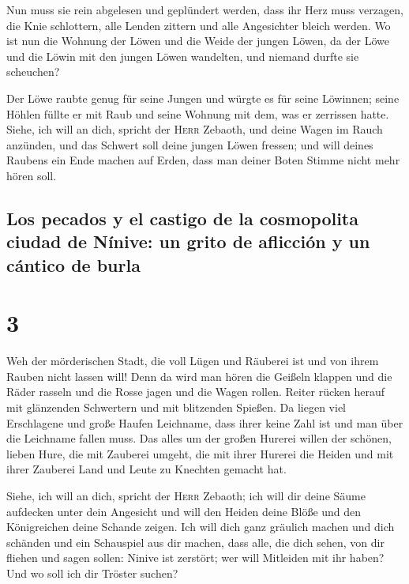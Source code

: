  Nun muss sie rein abgelesen und geplündert werden, dass
ihr Herz muss verzagen, die Knie schlottern, alle Lenden zittern und
alle Angesichter bleich werden.  Wo ist nun die Wohnung
der Löwen und die Weide der jungen Löwen, da der Löwe und die Löwin mit
den jungen Löwen wandelten, und niemand durfte sie scheuchen?

 Der Löwe raubte genug für seine Jungen und würgte es für
seine Löwinnen; seine Höhlen füllte er mit Raub und seine Wohnung mit
dem, was er zerrissen hatte.  Siehe, ich will an dich,
spricht der \textsc{Herr} Zebaoth, und deine Wagen im Rauch anzünden,
und das Schwert soll deine jungen Löwen fressen; und will deines Raubens
ein Ende machen auf Erden, dass man deiner Boten Stimme nicht mehr hören
soll.

\hypertarget{los-pecados-y-el-castigo-de-la-cosmopolita-ciudad-de-nuxednive-un-grito-de-aflicciuxf3n-y-un-cuxe1ntico-de-burla}{%
\subsection{Los pecados y el castigo de la cosmopolita ciudad de Nínive:
un grito de aflicción y un cántico de
burla}\label{los-pecados-y-el-castigo-de-la-cosmopolita-ciudad-de-nuxednive-un-grito-de-aflicciuxf3n-y-un-cuxe1ntico-de-burla}}

\hypertarget{section-2}{%
\section{3}\label{section-2}}

 Weh der mörderischen Stadt, die voll Lügen und Räuberei
ist und von ihrem Rauben nicht lassen will!  Denn da wird
man hören die Geißeln klappen und die Räder rasseln und die Rosse jagen
und die Wagen rollen.  Reiter rücken herauf mit glänzenden
Schwertern und mit blitzenden Spießen. Da liegen viel Erschlagene und
große Haufen Leichname, dass ihrer keine Zahl ist und man über die
Leichname fallen muss.  Das alles um der großen Hurerei
willen der schönen, lieben Hure, die mit Zauberei umgeht, die mit ihrer
Hurerei die Heiden und mit ihrer Zauberei Land und Leute zu Knechten
gemacht hat.

 Siehe, ich will an dich, spricht der \textsc{Herr}
Zebaoth; ich will dir deine Säume aufdecken unter dein Angesicht und
will den Heiden deine Blöße und den Königreichen deine Schande zeigen.
 Ich will dich ganz gräulich machen und dich schänden und
ein Schauspiel aus dir machen,  dass alle, die dich sehen,
von dir fliehen und sagen sollen: Ninive ist zerstört; wer will
Mitleiden mit ihr haben? Und wo soll ich dir Tröster suchen?

